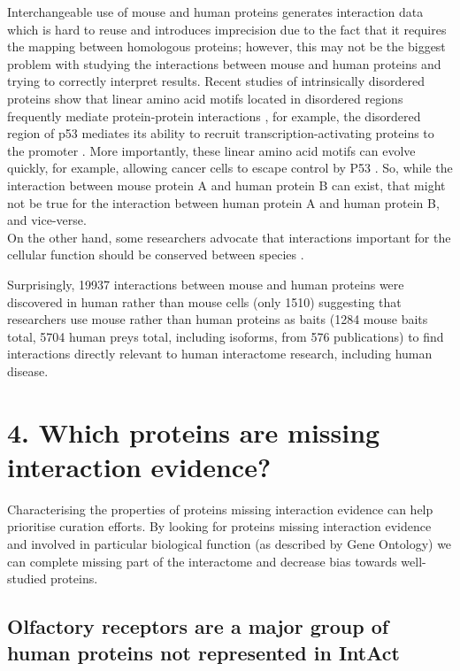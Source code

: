 \documentclass[12pt,]{report}
\begin{document}
Interchangeable use of mouse and human proteins generates interaction
data which is hard to reuse and introduces imprecision due to the fact
that it requires the mapping between homologous proteins; however, this
may not be the biggest problem with studying the interactions between
mouse and human proteins and trying to correctly interpret results.
Recent studies of intrinsically disordered proteins show that linear
amino acid motifs located in disordered regions frequently mediate
protein-protein interactions \citep{Babu:2016aa}, for example, the
disordered region of p53 mediates its ability to recruit
transcription-activating proteins to the promoter \citep{Buljan:2012aa}.
More importantly, these linear amino acid motifs can evolve quickly, for
example, allowing cancer cells to escape control by P53
\citep{Buljan:2012aa}. So, while the interaction between mouse protein A
and human protein B can exist, that might not be true for the
interaction between human protein A and human protein B, and
vice-verse.\\
On the other hand, some researchers advocate that interactions important
for the cellular function should be conserved between species
\citep{Li:2017aa}.

Surprisingly, 19937 interactions between mouse and human proteins were
discovered in human rather than mouse cells (only 1510) suggesting that
researchers use mouse rather than human proteins as baits (1284 mouse
baits total, 5704 human preys total, including isoforms, from 576
publications) to find interactions directly relevant to human
interactome research, including human disease.

\section{4. Which proteins are missing interaction
evidence?}\label{which-proteins-are-missing-interaction-evidence}

Characterising the properties of proteins missing interaction evidence
can help prioritise curation efforts. By looking for proteins missing
interaction evidence and involved in particular biological function (as
described by Gene Ontology) we can complete missing part of the
interactome and decrease bias towards well-studied proteins.

\subsection{Olfactory receptors are a major group of human proteins not
represented in
IntAct}\label{olfactory-receptors-are-a-major-group-of-human-proteins-not-represented-in-intact}
\end{document}
